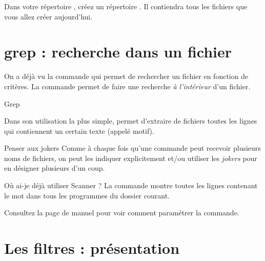 \documentclass[a4paper,11pt]{style-esi/td}
\begin{document}
\entete
\titre
{}
\lastedit

\bigskip
\tableofcontents

\vfill
\begin{infobox}
    Dans votre répertoire , 
	créez un répertoire . 
    Il contiendra tous les fichiers que vous allez créer aujourd'hui. 
\end{infobox}
\vfill

\newpage

\section{grep : recherche dans un fichier}

	On a déjà vu la commande 
	qui permet de rechercher un fichier en fonction de critères.
	La commande  permet de faire une recherche 
	\emph{à l'intérieur} d'un fichier.

	\begin{theorie}{Grep}

		\medskip
		Dans son utilisation la plus simple, 
		permet d’extraire de fichiers 
		toutes les lignes qui contiennent un certain texte 
		(appelé motif).
	\end{theorie}

	\begin{infotbox}{Penser aux jokers}
		Comme à chaque fois qu'une commande peut recevoir plusieurs noms de fichiers,
		on peut les indiquer explicitement et/ou utiliser les \emph{jokers}
		pour en désigner plusieurs d'un coup.
	\end{infotbox}

	\begin{Exemple}{Où ai-je déjà utiliser Scanner ?}
		La commande  montre toutes les lignes
		contenant le mot 
		dans tous les programmes  du dossier courant.
	\end{Exemple}

	Consultez la page de manuel pour voir comment paramétrer la commande.

\section{Les filtres : présentation}

\end{document}
